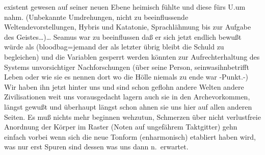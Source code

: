 \documentclass[
]{article}
\begin{document}
existent gewesen auf seiner neuen Ebene heimisch fühlte und diese fürs
U.um nahm. (Unbekannte Umdrehungen, nicht zu beeinflussende
Weltendevorstellungen, Hybris und Katatonie, Sprachlähmung bis zur
Aufgabe des Geistes\ldots)\ldots{} Seamus war zu beeinflussen daß er
sich jetzt endlich bewußt würde als (bloodbag=jemand der als letzter
übrig bleibt die Schuld zu begleichen) und die Variablen gesperrt werden
könnten zur Aufrechterhaltung des Systems unvorsichtiger Nachforschungen
(über seine Person, seinwasihnbetrifft Leben oder wie sie es nennen dort
wo die Hölle niemals zu ende war -Punkt.-) Wir haben ihn jetzt hinter
uns und sind schon geflohn andere Welten andere Zivilisationen weit uns
vorausgedacht lagern auch sie in den Archevorkommen, längst gewußt und
überhaupt längst schon ahnen sie uns hier auf allen anderen Seiten. Es
muß nichts mehr beginnen wehzutun, Schmerzen über nicht verlustfreie
Anordnung der Körper im Raster (Noten auf ungefährem Taktgitter) gehn
einfach vorbei wenn sich die neue Tonform (enharmonisch) etabliert haben
wird, was nur erst Spuren sind dessen was uns dann n.~erwartet.
\end{document}
